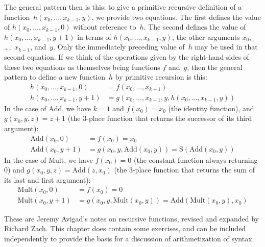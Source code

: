 \documentclass[10pt,a4paper]{article}
\theoremstyle{plain}
\theoremstyle{definition}
\theoremstyle{remark}
\newenvironment{editorial}{}{}
\newcommand*{\olchapter}[3]{}
\providecommand{\Mult}{\ensuremath{\mathrm{Mult}}}
\providecommand{\Add}{\ensuremath{\mathrm{Add}}}
\providecommand{\Succ}{\ensuremath{\mathrm{S}}}
\begin{document}
The general pattern then is this: to give a primitive recursive
definition of a function~$h(x_0, \dots, x_{k-1}, y)$, we provide two
equations. The first defines the value of $h(x_0, \dots, x_{k-1}, 0)$
without reference to~$h$. The second defines the value of $h(x_0,
\dots, x_{k-1}, y+1)$ in terms of $h(x_0, \dots, x_{k-1}, y)$, the
other arguments $x_0$, \dots,~$x_{k-1}$, and~$y$. Only the immediately
preceding value of~$h$ may be used in that second equation.  If we
think of the operations given by the right-hand-sides of these two
equations as themselves being functions $f$ and~$g$, then the general
pattern to define a new function~$h$ by primitive recursion is this:
\begin{align*}
  h(x_0, \dots, x_{k-1}, 0) & = f(x_0, \dots, x_{k-1})\\
  h(x_0, \dots, x_{k-1}, y+1) & =
  g(x_0, \dots, x_{k-1}, y, h(x_0, \dots, x_{k-1}, y))
\end{align*}  
In the case of $\Add$, we have $k=1$ and $f(x_0) = x_0$ (the
identity function), and $g(x_0, y, z) = z + 1$ (the $3$-place function
that returns the successor of its third argument):
\begin{align*}
  \Add(x_0, 0) & = f(x_0) = x_0\\
  \Add(x_0, y+1) & = g(x_0, y, \Add(x_0, y)) =
  \Succ(\Add(x_0, y))
\end{align*}
In the case of $\Mult$, we have $f(x_0) = 0$ (the constant
function always returning~$0$) and $g(x_0, y, z) = \Add(z,x_0)$
(the $3$-place function that returns the sum of its last and first
argument):
\begin{align*}
  \Mult(x_0,0) & =  f(x_0) = 0 \\
  \Mult(x_0,y+1) & =  g(x_0, y, \Mult(x_0,y)) =
  \Add(\Mult(x_0,y), x_0)
\end{align*}





\olchapter{cmp}{rec}{Recursive Functions}

\begin{editorial}
  These are Jeremy Avigad's notes on recursive functions, revised and
  expanded by Richard Zach. This chapter does contain some exercises,
  and can be included independently to provide the basis for a
  discussion of arithmetization of syntax.
\end{editorial}
\end{document}

